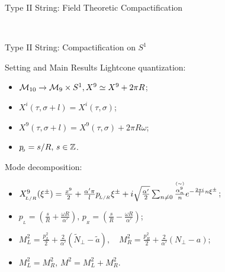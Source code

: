 

\begin{frame}{Type II String: Field Theoretic Compactification}
	\begin{table}[c]
		\vspace{-0.1cm}
		\scalebox{0.63}{
			
		}
	\end{table}
\end{frame}

\begin{frame}[standout]
	\color{white}{Is This a Coincidence?} \pause \\
	\color{white}{is This a Feature of the Massless Spectrum?}
\end{frame}

\begin{frame}{Type II String: Compactification on \texorpdfstring{$S^1$}{S1}}
	\begin{block}{Setting and Main Results}
		Lightcone quantization:
		\vspace{-3mm}
		\begin{itemize}
			\item $\mathcal{M}_{10} \to \mathcal{M}_9 \times S^1, X^9 \simeq X^9 + 2\pi R$;
			\item $X^i(\tau,\sigma + l) = X^i(\tau,\sigma)$; \pause
			\item $X^9(\tau,\sigma + l) = X^9(\tau,\sigma)+2\pi R \omega$;
			\item $p_{\!_{9}} = {s}/{R}, \, s\in\mathbb{Z}$.
		\end{itemize} \pause

		Mode decomposition:
		\vspace{-5mm}
		\begin{itemize}
			\item $X^{9}_{\!_{L/R}}(\xi^\pm)= \frac{x^{9}}{2} + \frac{\alpha' \pi}{l} p_{\!_{L/R}} \xi^\pm + i \sqrt{\frac{\alpha'}{2}} \sum_{n\neq 0} \frac{\mathord{\mathop{\alpha^9_n}\limits^{\scriptscriptstyle(\sim)}}}{n}e^{-\frac{2\pi i}{l}n \xi^\pm}$;
			\item $p_{\!_L} = \left( \frac{s}{R} + \frac{\omega R}{\alpha'} \right), \, p_{\!_R} = \left( \frac{s}{R} - \frac{\omega R}{\alpha'} \right)$; \pause
			\item $M^2_L = \frac{p^2_L}{2} + \frac{2}{\alpha'} \left( \tilde{N}_\perp - \tilde{a} \right), \quad M^2_R = \frac{p^2_R}{2} + \frac{2}{\alpha'} \left( {N}_\perp - a \right)$;
			\item $M^2_L = M^2_R, \, M^2 = M^2_L + M^2_R$.
		\end{itemize}
	\end{block}
\end{frame}

